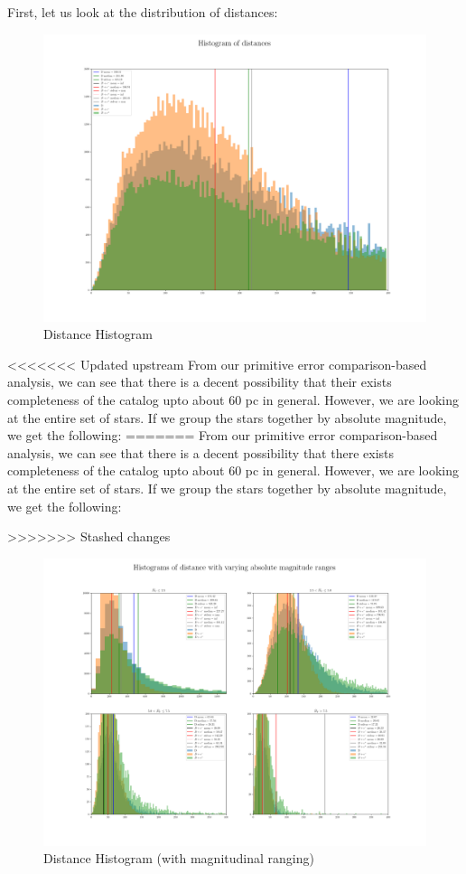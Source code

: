 \documentclass{business-covered} %
\begin{document}
		First, let us look at the distribution of distances:
		\begin{figure}[h!]
			\includegraphics[scale=.33]{figures/dist_hist_base.png}
			\caption{Distance Histogram}
		\end{figure}
		
<<<<<<< Updated upstream
		From our primitive error comparison-based analysis, we can see that there is a decent possibility that their exists completeness of the catalog upto about 60 pc in general. However, we are looking at the entire set of stars. If we group the stars together by absolute magnitude, we get the following:
		\pagebreak 
=======
		From our primitive error comparison-based analysis, we can see that there is a decent possibility that there exists completeness of the catalog upto about 60 pc in general. However, we are looking at the entire set of stars. If we group the stars together by absolute magnitude, we get the following:
		
>>>>>>> Stashed changes
		\begin{figure}[h!]
			\includegraphics[scale=.33]{figures/dist_hist.png}
			\caption{Distance Histogram (with magnitudinal ranging)}
		\end{figure}
		
\end{document}
